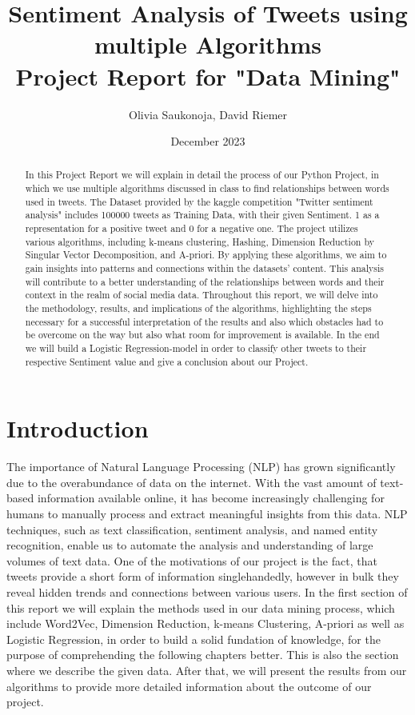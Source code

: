 \documentclass[11pt,a4paper]{article}
\title{Sentiment Analysis of Tweets using multiple Algorithms \\[0.5em] \large{Project Report for "Data Mining" \\[0.5em]} }
\author{Olivia Saukonoja, David Riemer}
\date{December 2023}
\begin{document}
\maketitle


\newpage
\begin{abstract}
In this Project Report we will explain in detail the process of our Python Project, in which we use multiple algorithms discussed in class to find relationships between words used in tweets. The Dataset provided by the kaggle competition "Twitter sentiment analysis" includes 100000 tweets as Training Data, with their given Sentiment. 1 as a representation for a positive tweet and 0 for a negative one.
The project utilizes various algorithms, including k-means clustering, Hashing, Dimension Reduction by Singular Vector Decomposition, and A-priori. By applying these algorithms, we aim to gain insights into patterns and connections within the datasets' content. 
This analysis will contribute to a better understanding of the relationships between words and their context in the realm of social media data. 
Throughout this report, we will delve into the methodology, results, and implications of the algorithms, highlighting the steps necessary for a successful interpretation of the results and also which obstacles had to be overcome on the way but also what room for improvement is available.
In the end we will build a Logistic Regression-model in order to classify other tweets to their respective Sentiment value and give a conclusion about our Project.
\end{abstract}
\tableofcontents
\newpage
\section{Introduction}
The importance of Natural Language Processing (NLP) has grown significantly due to the overabundance of data on the internet. With the vast amount of text-based information available online, it has become increasingly challenging for humans to manually process and extract meaningful insights from this data. NLP techniques, such as text classification, sentiment analysis, and named entity recognition, enable us to automate the analysis and understanding of large volumes of text data. 
One of the motivations of our project is the fact, that tweets provide a short form of information singlehandedly, however in bulk they reveal hidden trends and connections between various users. 
In the first section of this report we will explain the methods used in our data mining process, which include Word2Vec, Dimension Reduction, k-means Clustering, A-priori as well as Logistic Regression, in order to build a solid fundation of knowledge, for the purpose of comprehending the following chapters better. This is also the section where we describe the given data. After that, we will present the results from our algorithms to provide more detailed information about the outcome of our project.
\end{document}
